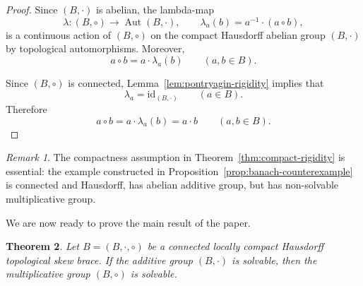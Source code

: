 \documentclass[reqno]{amsart}
\numberwithin{equation}{section}
\newtheorem{theorem}{Theorem}[section]
\theoremstyle{definition}
\theoremstyle{remark}
\newtheorem{remark}[theorem]{Remark}
\DeclareMathOperator{\Aut}{Aut}
\newcommand{\id}{\mathrm{id}}
\begin{document}
\begin{proof}
Since $(B,\cdot)$ is abelian, the lambda-map
\[
\lambda\colon (B,\circ)\longrightarrow \Aut(B,\cdot),
\qquad
\lambda_a(b)=a^{-1}\cdot(a\circ b),
\]
is a continuous action of $(B,\circ)$ on the compact Hausdorff abelian group
$(B,\cdot)$ by topological automorphisms. Moreover,
\[
a\circ b=a\cdot\lambda_a(b)
\qquad
(a,b\in B).
\]

Since $(B,\circ)$ is connected, Lemma~\ref{lem:pontryagin-rigidity} implies
that
\[
\lambda_a=\id_{(B,\cdot)}
\qquad
(a\in B).
\]
Therefore
\[
a\circ b=a\cdot\lambda_a(b)=a\cdot b
\qquad
(a,b\in B).
\]
\end{proof}

\begin{remark}
The compactness assumption in Theorem~\ref{thm:compact-rigidity} is essential:
the example constructed in Proposition~\ref{prop:banach-counterexample} is
connected and Hausdorff, has abelian additive group, but has non-solvable
multiplicative group. 
\end{remark}


We are now ready to prove the main result of the paper.

\begin{theorem}\label{thm:lc-solvable}
Let $B=(B,\cdot,\circ)$ be a connected locally compact Hausdorff topological
skew brace. If the additive group $(B,\cdot)$ is solvable, then the
multiplicative group $(B,\circ)$ is solvable.
\end{theorem}
\end{document}

